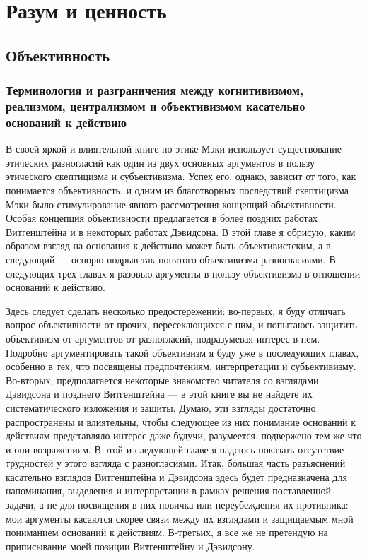 \documentclass[11pt]{book}
\begin{document}
\part{Разум и ценность}

\chapter{Объективность}

\section{Терминология и разграничения между когнитивизмом, реализмом, централизмом и объективизмом касательно оснований к действию}

В своей яркой и влиятельной книге по этике Мэки использует существование этических разногласий как один из двух основных аргументов в пользу этического скептицизма и субъективизма. Успех его, однако, зависит от того, как понимается объективность, и одним из благотворных последствий скептицизма Мэки было стимулирование явного рассмотрения концепций объективности. Особая концепция объективности предлагается в более поздних работах Витгенштейна и в некоторых работах Дэвидсона. В этой главе я обрисую, каким образом взгляд на основания к действию может быть объективистским, а в следующий --- оспорю подрыв так понятого объективизма разногласиями. В следующих трех главах я разовью аргументы в пользу объективизма в отношении оснований к действию.

Здесь следует сделать несколько предостережений: во-первых, я буду отличать вопрос объективности от прочих, пересекающихся с ним, и попытаюсь защитить объективизм от аргументов от разногласий, подразумевая интерес в нем. Подробно аргументировать такой объективизм я буду уже в последующих главах, особенно в тех, что посвящены предпочтениям, интерпретации и субъективизму. Во-вторых, предполагается некоторые знакомство читателя со взглядами Дэвидсона и позднего Витгенштейна --- в этой книге вы не найдете их систематического изложения и защиты. Думаю, эти взгляды достаточно распространены и влиятельны, чтобы следующее из них понимание оснований к действиям представляло интерес даже будучи, разумеется, подвержено тем же что и они возражениям. В этой и следующей главе я надеюсь показать отсутствие трудностей у этого взгляда с разногласиями. Итак, большая часть разъяснений касательно взглядов Витгенштейна и Дэвидсона здесь будет предназначена для напоминания, выделения и интерпретации в рамках решения поставленной задачи, а не для посвящения в них новичка или переубеждения их противника: мои аргументы касаются скорее связи между их взглядами и защищаемым мной пониманием оснований к действиям. В-третьих, я все же не претендую на приписывание моей позиции Витгенштейну и Дэвидсону.
\end{document}
